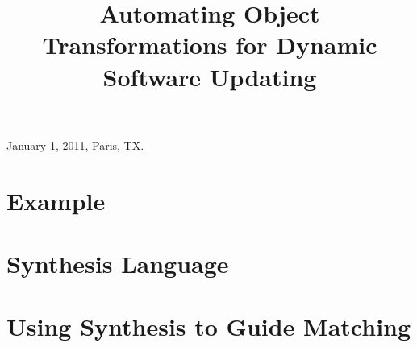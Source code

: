 \documentclass[natbib]{sigplanconf}
\begin{document}
 {January 1, 2011, Paris, TX.}


\title{Automating Object Transformations for Dynamic Software Updating
    }






\maketitle












\section{Example}



\section{Synthesis Language}

\section{Using Synthesis to Guide Matching}
\end{document}
